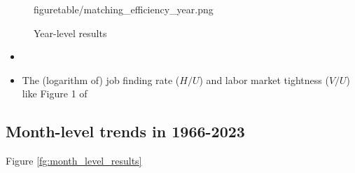 \documentclass[12pt]{article}
\begin{document}
\begin{figure}[!ht]
\begin{center}
{  {figuretable/matching_efficiency_year.png}}\\
  \caption{Year-level results}
  \label{fg:year_level_results} 
  \end{center}
  \footnotesize
\end{figure} 



\begin{itemize}
    \item 
    \item The (logarithm of) job finding rate ($H/U$) and labor market tightness ($V/U$) like Figure 1 of \cite{borowczyk2013accounting}
    
\end{itemize}

\subsection{Month-level trends in 1966-2023}

Figure \ref{fg:month_level_results}
\end{document}
